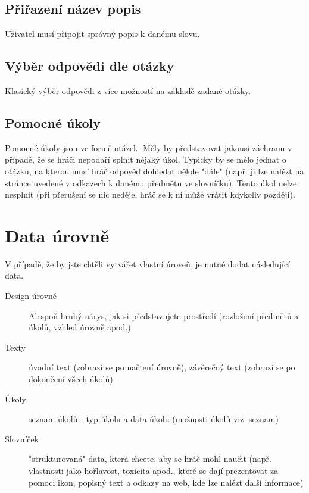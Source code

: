 \documentclass[a4paper,12pt]{article}
\begin{document}
\subsection{Přiřazení název popis}
Uživatel musí připojit správný popis k danému slovu.
\subsection{Výběr odpovědi dle otázky}
Klasický výběr odpovědi z více možností na základě zadané otázky.
\begin{figure}[H]
\end{figure}
\subsection{Pomocné úkoly}
Pomocné úkoly jsou ve formě otázek. Měly by představovat jakousi záchranu v případě, že se hráči nepodaří splnit nějaký úkol. Typicky by se mělo  jednat o otázku, na kterou musí hráč odpověď dohledat někde "dále" (např. ji lze nalézt na stránce uvedené v odkazech k danému předmětu ve slovníčku). Tento úkol nelze nesplnit (při přerušení se nic neděje, hráč se k ní může vrátit kdykoliv později).
\newpage
\section{Data úrovně}
V případě, že by jste chtěli vytvářet vlastní úroveň, je nutné dodat následující data.\\
\begin{description}
\item[Design úrovně] Alespoň hrubý nárys, jak si představujete prostředí (rozložení předmětů a úkolů, vzhled úrovně apod.)
\item[Texty] úvodní text (zobrazí se po načtení úrovně), závěrečný text (zobrazí se po dokončení všech úkolů)
\item[Úkoly] seznam úkolů - typ úkolu a data úkolu (možnosti úkolů viz. seznam) 
\item[Slovníček] "strukturovaná" data, která chcete, aby se hráč mohl naučit (např. vlastnosti jako hořlavost, toxicita apod., které se dají prezentovat za pomoci ikon, popisný text a odkazy na web, kde lze nalézt další informace)
\end{description}
\end{document}
